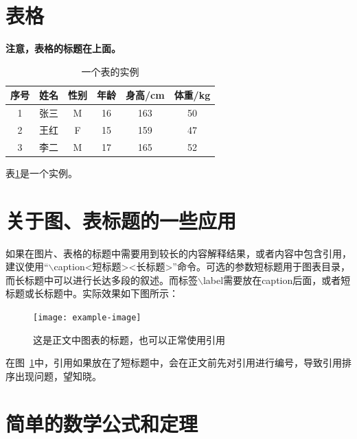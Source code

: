 \section{表格}

\par \textbf{注意，表格的标题在上面。}

\begin{table}[!ht]
\centering
\caption{一个表的实例}
\label{tab:tabobj}
    \begin{tabular}{cccccc}
        \toprule
        序号 & 姓名 & 性别 & 年龄 & 身高/cm & 体重/kg \\
        \midrule
        1 & 张三 & M & 16 & 163 & 50 \\
        2 & 王红 & F & 15 & 159 & 47 \\
        3 & 李二 & M & 17 & 165 & 52 \\
        \bottomrule
    \end{tabular}
\end{table}

\par 表\ref{tab:tabobj}是一个实例。

\section{关于图、表标题的一些应用}

\par 如果在图片、表格的标题中需要用到较长的内容解释结果，或者内容中包含引用，建议使用``$\backslash$caption{<短标题>}{<长标题>}''命令。可选的参数短标题用于图表目录，而长标题中可以进行长达多段的叙述。而标签$\backslash$label需要放在caption后面，或者短标题或长标题中。实际效果如下图所示：

\begin{figure}[!ht]
    \centering
    \texttt{[image: example-image]}
    \caption[这是图目录中的标题]{这是正文中图表的标题，也可以正常使用引用\cite{broder1997resemblance}}\label{fig:image}
\end{figure}

在图~\ref{fig:image}中，引用如果放在了短标题中，会在正文前先对引用进行编号，导致引用排序出现问题，望知晓。


\section{简单的数学公式和定理}

